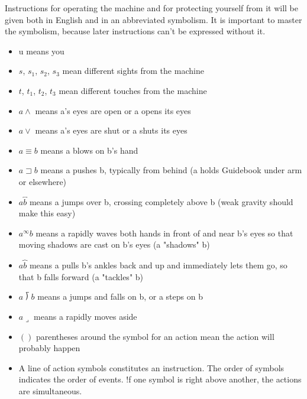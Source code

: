 \documentclass[10pt,twoside,draft]{memoir}
\begin{document}
{{Instructions for operating the machine and for protecting yourself from 
it will be given both in English and in an abbreviated symbolism. It is 
important to master the symbolism, because later instructions can't be 
expressed without it. 

\begin{itemize}
\item u means you 

\item $s$, $s_1$, $s_2$, $s_3$ mean different sights from the machine 

\item $t$, $t_1$, $t_2$, $t_3$ mean different touches from the machine 

\item $a\wedge$ means a's eyes are open or a opens its eyes 

\item $a\vee$ means a's eyes are shut or a shuts its eyes 

\item $a\equiv b$ means a blows on b's hand 

\item $a\sqsupset b$ means a pushes b, typically from behind 
(a holds Guidebook under arm or elsewhere) 

\item $a\overbracket{b}$ means a jumps over b, crossing completely above b (weak gravity 
should make this easy) 

\item $a^\infty b$ means a rapidly waves both hands in front of and near b's eyes so that 
moving shadows are cast on b's eyes (a "shadows" b) 

\item $a\overbrace{b}$ means a pulls b's ankles back and up and immediately lets them go, so 
that b falls forward (a "tackles" b) 

\item $a\longdivision{b}$ means a jumps and falls on b, or a steps on b 

\item $a\lrcorner$ means a rapidly moves aside 

\item $()$ parentheses around the symbol for an action mean the action will 
probably happen 

\item A line of action symbols constitutes an instruction. The order of symbols 
indicates the order of events. !f one symbol is right above another, the 
actions are simultaneous. 
\end{itemize}

}}
\end{document}
